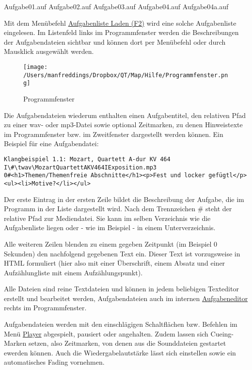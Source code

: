 \documentclass[a4paper,DIV=11
]{scrartcl}
\newenvironment{Shaded}{}{}
\newcommand{\NormalTok}[1]{#1}
\begin{document}
	\begin{Shaded}
\begin{Highlighting}[]
\NormalTok{Aufgabe01.auf}
\NormalTok{Aufgabe02.auf}
\NormalTok{Aufgabe03.auf}
\NormalTok{Aufgabe04.auf}
\NormalTok{Aufgabe04a.auf}
\end{Highlighting}
\end{Shaded}

Mit dem Menübefehl \protect\hyperlink{AufgabenlisteLaden}{Aufgabenliste
Laden (F2)} wird eine solche Aufgabenliste eingelesen. Im Listenfeld
links im Programmfenster werden die Beschreibungen der Aufgabendateien
sichtbar und können dort per Menübefehl oder durch Mausklick ausgewählt
werden.

\begin{figure}
\centering
\texttt{[image: /Users/manfreddings/Dropbox/QT/Map/Hilfe/Programmfenster.png]}
\caption{Programmfenster}
\end{figure}

Die Aufgabendateien wiederum enthalten einen Aufgabentitel, den
relativen Pfad zu einer wav- oder mp3-Datei sowie optional Zeitmarken,
zu denen Hinweistexte im Programmfenster bzw. im Zweitfenster
dargestellt werden können. Ein Beispiel für eine Aufgabendatei:

{\scriptsize
	\begin{verbatim}
Klangbeispiel 1.1: Mozart, Quartett A-dur KV 464 I\#\twav\MozartQuartettAKV464IExposition.mp3
0#<h1>Themen/Themenfreie Abschnitte</h1><p>Fest und locker gefügtl</p><ul><li>Motive?</li></ul>
\end{verbatim}
}

Der erste Eintrag in der ersten Zeile bildet die Beschreibung der
Aufgabe, die im Programm in der Liste dargestellt wird. Nach dem
Trennzeichen \# steht der relative Pfad zur Mediendatei. Sie kann im
selben Verzeichnis wie die Aufgabenliste liegen oder - wie im Beispiel -
in einem Unterverzeichnis.

Alle weiteren Zeilen blenden zu einem gegeben Zeitpunkt (im Beispiel 0
Sekunden) den nachfolgend gegebenen Text ein. Dieser Text ist
vorzugsweise in HTML formuliert (hier also mit einer Überschrift, einem
Absatz und einer Aufzählungliste mit einem Aufzählungspunkt).

Alle Dateien sind reine Textdateien und können in jedem beliebigen
Texteditor erstellt und bearbeitet werden, Aufgabendateien auch im
internen \protect\hyperlink{BefehleImMenuAufgabeneditor}{Aufgabeneditor}
rechts im Programmfenster.

Aufgabendateien werden mit den einschlägigen Schaltflächen bzw. Befehlen
im Menü \protect\hyperlink{BefehleImMenuPlayer}{Player} abgespielt,
pausiert oder angehalten. Zudem lassen sich Cueing-Marken setzen, also
Zeitmarken, von denen aus die Sounddateien gestartet ewerden können.
Auch die Wiedergabelautstärke lässt sich einstellen sowie ein
automatisches Fading vornehmen.
\end{document}

